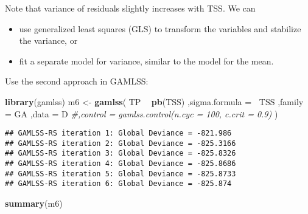 \documentclass[
]{book}
\newenvironment{Shaded}{\begin{snugshade}}{\end{snugshade}}
\newcommand{\CommentTok}[1]{\textcolor[rgb]{0.56,0.35,0.01}{\textit{#1}}}
\newcommand{\DataTypeTok}[1]{\textcolor[rgb]{0.13,0.29,0.53}{#1}}
\newcommand{\KeywordTok}[1]{\textcolor[rgb]{0.13,0.29,0.53}{\textbf{#1}}}
\newcommand{\NormalTok}[1]{#1}
\newcommand{\OperatorTok}[1]{\textcolor[rgb]{0.81,0.36,0.00}{\textbf{#1}}}
\newcommand{\StringTok}[1]{\textcolor[rgb]{0.31,0.60,0.02}{#1}}
\providecommand{\tightlist}{%
  \setlength{\itemsep}{0pt}\setlength{\parskip}{0pt}}
\begin{document}
Note that variance of residuals slightly increases with TSS. We can

\begin{itemize}
\tightlist
\item
  use generalized least squares (GLS) to transform the variables and stabilize the variance, or
\item
  fit a separate model for variance, similar to the model for the mean.
\end{itemize}

Use the second approach in GAMLSS:

\begin{Shaded}
\begin{Highlighting}[]
\KeywordTok{library}\NormalTok{(gamlss)}
\NormalTok{m6 <-}\StringTok{ }\KeywordTok{gamlss}\NormalTok{(}
\NormalTok{  TP }\OperatorTok{~}\StringTok{ }\KeywordTok{pb}\NormalTok{(TSS)}
\NormalTok{  ,}\DataTypeTok{sigma.formula =} \OperatorTok{~}\NormalTok{TSS}
\NormalTok{  ,}\DataTypeTok{family =}\NormalTok{ GA}
\NormalTok{  ,}\DataTypeTok{data =}\NormalTok{ D}
  \CommentTok{#,control = gamlss.control(n.cyc = 100, c.crit = 0.9)}
\NormalTok{)}
\end{Highlighting}
\end{Shaded}

\begin{verbatim}
## GAMLSS-RS iteration 1: Global Deviance = -821.986 
## GAMLSS-RS iteration 2: Global Deviance = -825.3166 
## GAMLSS-RS iteration 3: Global Deviance = -825.8326 
## GAMLSS-RS iteration 4: Global Deviance = -825.8686 
## GAMLSS-RS iteration 5: Global Deviance = -825.8733 
## GAMLSS-RS iteration 6: Global Deviance = -825.874
\end{verbatim}

\begin{Shaded}
\begin{Highlighting}[]
\KeywordTok{summary}\NormalTok{(m6)}
\end{Highlighting}
\end{Shaded}
\end{document}
